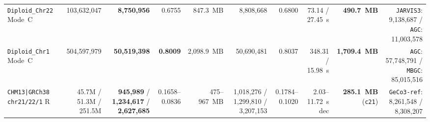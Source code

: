 \documentclass[10pt]{article}
\theoremstyle{definition}
\begin{document}
\begin{table}[h!]
{\begin{tabular}{lrrrrrrrrr}
\texttt{Diploid\_Chr22} Mode~C & 103,632,047 & \textbf{8,750,956} & 0.6755 & 847.3~MB & 8,808,668 & 0.6800 & 73.14 / 27.45~s & \textbf{490.7~MB} & \texttt{JARVIS3}: 9,138,687 / \texttt{AGC}: 11,003,578 \\
\texttt{Diploid\_Chr1} Mode~C & 504,597,979 & \textbf{50,519,398} & \textbf{0.8009} & 2,098.9~MB & 50,690,481 & 0.8037 & 348.31 / 15.98~s & \textbf{1,709.4~MB} & \texttt{AGC}: 57,748,791 / \texttt{MBGC}: 85,015,516 \\
\texttt{CHM13|GRCh38 chr21/22/1} R & 45.7M / 51.3M / 251.5M & \textbf{945,989} / \textbf{1,234,617} / \textbf{2,627,685} & 0.1658--0.0836 & 475--967~MB & 1,018,276 / 1,299,810 / 3,207,153 & 0.1784--0.1020 & 2.03--11.72~s dec & \textbf{285.1~MB} (\texttt{c21}) & \texttt{GeCo3-ref}: 8,261,548 / 8,308,207 \\
\bottomrule
\end{tabular}%
}
\end{table}
\end{document}
